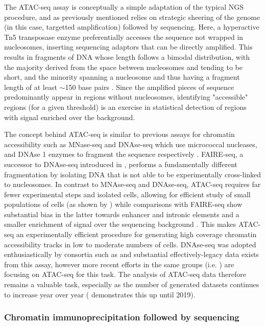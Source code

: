The ATAC-seq assay is conceptually a simple adaptation of the typical NGS procedure, and as previously mentioned relies on strategic sheering of the genome (in this case, targetted amplification) followed by sequencing. Here, a hyperactive Tn5 transposase enzyme preferentially accesses the sequence not wrapped in nucleosomes, inserting sequencing adaptors that can be directly amplified. This results in fragments of DNA whose length follows a bimodal distribution, with the majority derived from the space between nucleosomes and tending to be short, and the minority spanning a nucleosome and thus having a fragment length of at least $\sim$150 base pairs \cite{Yan2020a}. Since the amplified pieces of sequence predominantly appear in regions without nucleosomes, identifying "accessible" regions (for a given threshold) is an exercise in statistical detection of regions with signal enriched over the background.

The concept behind ATAC-seq is similar to previous assays for chromatin accessibility such as MNase-seq and DNAse-seq which use micrococcal nucleases, and DNAse 1 enzymes to fragment the sequence respectively \cite{Bell2011a}. FAIRE-seq, a successor to DNAse-seq introduced in \textcite{Giresi2007}, performs a fundamentally different fragmentation by isolating DNA that is not able to be experimentally cross-linked to nucleosomes. In contrast to MNAse-seq and DNAse-seq, ATAC-seq requires far fewer experimental steps and isolated cells, allowing for efficient study of small populations of cells (as shown by \textcite{Buenrostro2015a}) while comparisons with FAIRE-seq show substantial bias in the latter towards enhancer and intronic elements and a smaller enrichment of signal over the sequencing background \cite{Tsompana2014}. This makes ATAC-seq an experimentally efficient procedure for generating high coverage chromatin accessibility tracks in low to moderate numbers of cells. DNAse-seq was adopted enthusiastically by consortia such as \textcite{ENCODEProjectConsortium2012} and substantial effectively-legacy data exists from this assay, however more recent efforts in the same groups (i.e. \textcite{Moore2020}) are focusing on ATAC-seq for this task. The analysis of ATAC-seq data therefore remains a valuable task, especially as the number of generated datasets continues to increase year over year (\textcite{Yan2020a} demonstrates this up until 2019).

\subsubsection{Chromatin immunoprecipitation followed by sequencing} \label{intro:chip}


